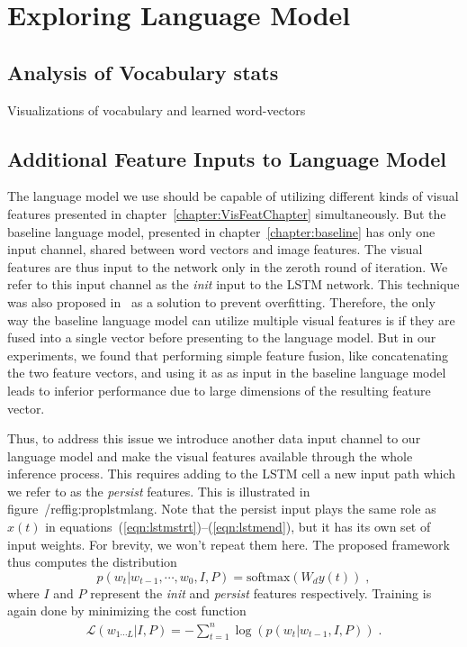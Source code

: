 \chapter{Exploring Language Model}
\label{chapter:langModel}
\section{Analysis of Vocabulary stats}
Visualizations of vocabulary and learned word-vectors

\section{Additional Feature Inputs to Language Model}
The language model we use should be capable of utilizing different kinds of
visual features presented in chapter~\ref{chapter:VisFeatChapter}
simultaneously.
But the baseline language model, presented in chapter~\ref{chapter:baseline} has
only one input channel, shared between word vectors and image features.
The visual features are thus input to the network only in the zeroth
round of iteration.
We refer to this input channel as the \emph{init} input to the LSTM network.
This technique was also proposed in~\cite{Vinyals_2015_CVPR} as a solution to
prevent overfitting. 
Therefore, the only way the baseline language model can utilize multiple visual
features is if they are fused into a single vector before presenting to the
language model.
But in our experiments, we found that performing simple feature fusion, like
concatenating the two feature vectors, and using it as as input in the baseline
language model leads to inferior performance due to large dimensions of the
resulting feature vector.

Thus, to address this issue we introduce another data input channel to our
language model and make the visual features available through the whole
inference process.
This requires adding to the LSTM cell a new input path which we refer to as the
\emph{persist} features.
This is illustrated in figure~/ref{fig:proplstmlang}.
Note that the persist input plays the same role as $x(t)$ in
equations~(\ref{eqn:lstmstrt})--(\ref{eqn:lstmend}), but it has its own set of
input weights.
For brevity, we won't repeat them here.
The proposed framework thus computes the distribution
\begin{equation}
p(w_t | w_{t-1},\cdots,w_0, I, P) = \text{softmax}(W_d y(t)) \;,
\end{equation}
\noindent where $I$ and $P$ represent the \emph{init} and \emph{persist}
features respectively.
Training is again done by minimizing the cost function
\begin{align}
  \mathcal{L}(w_{1\cdots L} | I,P) = -\sum_{t=1}^n \log(p(w_t|w_{t-1},I,P)) \; .
\end{align}


